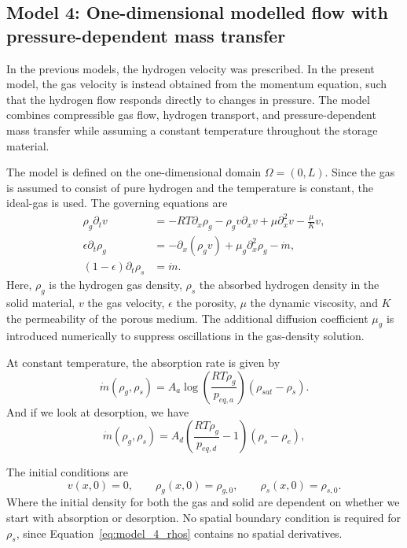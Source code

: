 \subsection{Model 4: One-dimensional modelled flow with pressure-dependent mass transfer}
\label{subsec:model_4}

In the previous models, the hydrogen velocity was prescribed. In the present model, the gas velocity is instead obtained from the momentum equation, such that the hydrogen flow responds directly to changes in pressure. The model combines compressible gas flow, hydrogen transport, and pressure-dependent mass transfer while assuming a constant temperature throughout the storage material.

The model is defined on the one-dimensional domain $\Omega=(0,L)$. Since the gas is assumed to consist of pure hydrogen and the temperature is constant, the ideal-gas is used. The governing equations are
\begin{subequations}\label{eq:model_4_governing_equations}
\begin{align}
\rho_g\partial_t v &= -RT\partial_x\rho_g-\rho_gv\partial_xv+\mu\partial_x^2v-\frac{\mu}{K}v, \label{eq:model_4_v}\\
\epsilon\partial_t\rho_g &= -\partial_x(\rho_gv)+\mu_g\partial_x^2\rho_g-\dot m, \label{eq:model_4_rhog}\\
(1-\epsilon)\partial_t\rho_s &= \dot m. \label{eq:model_4_rhos}
\end{align}
\end{subequations}
Here, $\rho_g$ is the hydrogen gas density, $\rho_s$ the absorbed hydrogen density in the solid material, $v$ the gas velocity, $\epsilon$ the porosity, $\mu$ the dynamic viscosity, and $K$ the permeability of the porous medium. The additional diffusion coefficient $\mu_g$ is introduced numerically to suppress oscillations in the gas-density solution.

At constant temperature, the absorption rate is given by
\begin{equation}\label{eq:model4_mdot}
\dot m(\rho_g,\rho_s)=A_a\log\left(\frac{RT\rho_g}{p_{eq,a}}\right)(\rho_{sat}-\rho_s).
\end{equation}
And if we look at desorption, we have
\begin{equation}\label{eq:model4_mdot_desorption}
\dot m(\rho_g,\rho_s)=A_d\left(\frac{RT\rho_g}{p_{eq,d}}-1\right)(\rho_s-\rho_{e}),
\end{equation}

The initial conditions are
\begin{equation}
v(x,0)=0,\qquad \rho_g(x,0)=\rho_{g,0},\qquad \rho_s(x,0)=\rho_{s,0}.
\end{equation}
Where the initial density for both the gas and solid are dependent on whether we start with absorption or desorption. No spatial boundary condition is required for $\rho_s$, since Equation~\eqref{eq:model_4_rhos} contains no spatial derivatives.

